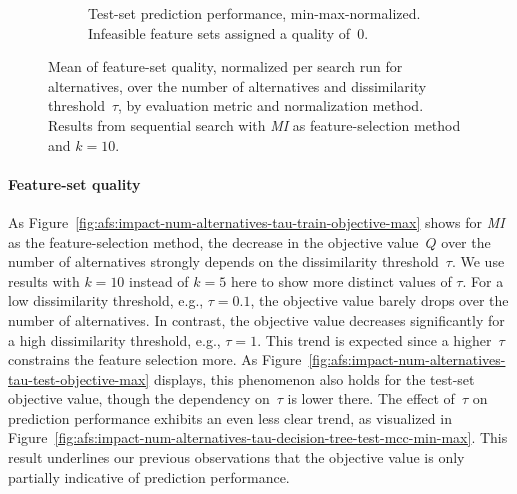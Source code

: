 \documentclass{article}
\theoremstyle{definition}
\begin{document}
\begin{figure}[p]
\begin{subfigure}[t]{0.48\textwidth}
		\caption{
			Test-set prediction performance, min-max-normalized.
			Infeasible feature sets assigned a quality of~0.
		}
		\label{fig:afs:impact-num-alternatives-tau-decision-tree-test-mcc-min-max-fillna}
	\end{subfigure}
	\caption{
		Mean of feature-set quality, normalized per search run for alternatives, over the number of alternatives and dissimilarity threshold~$\tau$, by evaluation metric and normalization method.
		Results from sequential search with \emph{MI} as feature-selection method and $k=10$.
	}
	\label{fig:afs:impact-num-alternatives-tau-quality}
\end{figure}

\paragraph{Feature-set quality}

As Figure~\ref{fig:afs:impact-num-alternatives-tau-train-objective-max} shows for \emph{MI} as the feature-selection method, the decrease in the objective value~$Q$ over the number of alternatives strongly depends on the dissimilarity threshold~$\tau$.
We use results with $k=10$ instead of $k=5$ here to show more distinct values of $\tau$.
For a low dissimilarity threshold, e.g., $\tau=0.1$, the objective value barely drops over the number of alternatives.
In contrast, the objective value decreases significantly for a high dissimilarity threshold, e.g., $\tau=1$.
This trend is expected since a higher~$\tau$ constrains the feature selection more.
As Figure~\ref{fig:afs:impact-num-alternatives-tau-test-objective-max} displays, this phenomenon also holds for the test-set objective value, though the dependency on~$\tau$ is lower there.
The effect of~$\tau$ on prediction performance exhibits an even less clear trend, as visualized in Figure~\ref{fig:afs:impact-num-alternatives-tau-decision-tree-test-mcc-min-max}.
This result underlines our previous observations that the objective value is only partially indicative of prediction performance.
\end{document}
